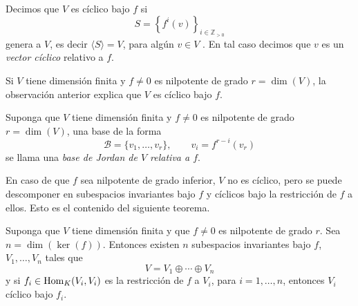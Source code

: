 \begin{defn}
Decimos que $V$ es c\'iclico bajo $f$ si
\[
S=\left\{f^i(v)\right\}_{i\in\mathbb{Z}_{>0}}
\]
genera a $V$, es decir $\langle S\rangle=V$, para alg\'un $v\in V$ . En tal caso decimos que $v$ es un \emph{vector c\'iclico} relativo a $f$.
\end{defn}

\begin{obs}
Si $V$ tiene dimensi\'on finita y $f\ne 0$ es nilpotente de grado $r=\dim(V)$, la observaci\'on anterior explica que $V$ es c\'iclico bajo $f$. 
\end{obs}

\begin{defn}
Suponga que $V$ tiene dimensi\'on finita y $f\ne 0$ es nilpotente de grado $r=\dim(V)$, una base de la forma
\[
\mathcal{B}=\{v_1,\ldots,v_r\},\qquad v_i=f^{r-i}(v_r)
\]
se llama una \emph{base de Jordan de $V$ relativa a $f$}.  
\end{defn}

\begin{obs}
En caso de que $f$ sea nilpotente de grado inferior, $V$ no es c\'iclico, pero se puede descomponer en subespacios invariantes bajo $f$ y c\'iclicos bajo la restricci\'on de $f$ a ellos. Esto es el contenido del siguiente teorema.
\end{obs}

\begin{teo}\label{formajordannil}
Suponga que $V$ tiene dimensi\'on finita y que $f\ne 0$ es nilpotente de grado $r$. Sea $n=\dim\left(\ker(f)\right)$. Entonces existen $n$ subespacios invariantes bajo $f$, $V_1,\ldots, V_n$ tales que  
\[
V=V_1\oplus\cdots\oplus V_n
\]
y si $f_i\in\operatorname{Hom}_K(V_i,V_i)$ es la restricci\'on de $f$ a $V_i$, para $i=1,\ldots,n$, entonces $V_i$ c\'iclico bajo $f_i$.
\end{teo}


